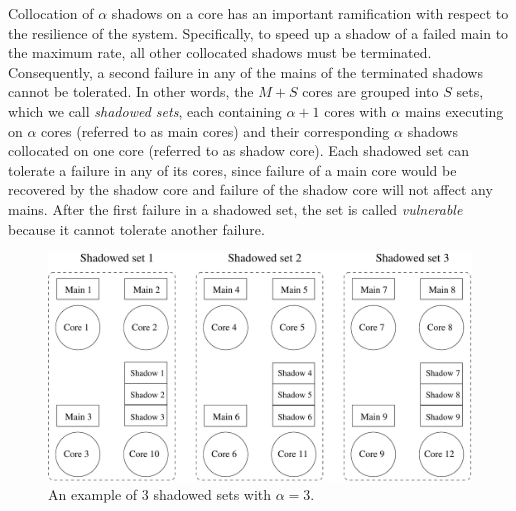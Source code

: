   
Collocation of $\alpha$ shadows on a core has an important ramification with respect to the resilience of the system. Specifically, to speed up a shadow 
of a failed main to the maximum rate, all other collocated shadows must be terminated. Consequently, a second failure in any of the mains of the terminated shadows cannot be tolerated. In other words, the $M+S$ cores are grouped into $S$ sets, which we call \emph{shadowed sets}, each containing $\alpha+1$ cores with $\alpha$ mains executing on $\alpha$ cores (referred to as main cores) and their corresponding $\alpha$ shadows collocated on one core (referred to as shadow core). Each shadowed set can tolerate a failure in any of its cores, since failure of a main core would be recovered by the shadow core and failure of the shadow core will not affect any mains. After the first failure in a shadowed set, the set is called \emph{vulnerable} because it cannot tolerate another failure. %

\begin{figure}[!t]
	\begin{center}
		\includegraphics[width=\columnwidth]{Figures/sc_mapping.pdf}
	\end{center}
	\vskip -0.25in 
	\caption{An example of 3 shadowed sets with $\alpha=3$.}
	\label{fig:sc_mapping}
\end{figure}
